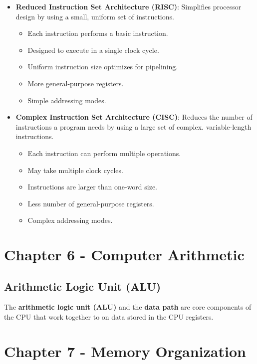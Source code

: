 \documentclass[12pt, letterpaper]{article}
\begin{document}
\begin{itemize}
    \item \textbf{Reduced Instruction Set Architecture (RISC)}: Simplifies processor design by using a small, uniform set of instructions.
        \begin{itemize}
            \item Each instruction performs a basic instruction.
            \item Designed to execute in a single clock cycle.
            \item Uniform instruction size optimizes for pipelining.
            \item More general-purpose registers.
            \item Simple addressing modes.
        \end{itemize}
    \item \textbf{Complex Instruction Set Architecture (CISC)}: Reduces the number of instructions a program needs by using a large set of complex. variable-length instructions.
        \begin{itemize}
            \item Each instruction can perform multiple operations.
            \item May take multiple clock cycles.
            \item Instructions are larger than one-word size.
            \item Less number of general-purpose registers.
            \item Complex addressing modes.
        \end{itemize}
\end{itemize}


\section*{Chapter 6 - Computer Arithmetic}

\subsection*{Arithmetic Logic Unit (ALU)}
The \textbf{arithmetic logic unit (ALU)} and the \textbf{data path} are core components of the CPU that work together to  on data stored in the CPU registers.

\section*{Chapter 7 - Memory Organization}
\end{document}
